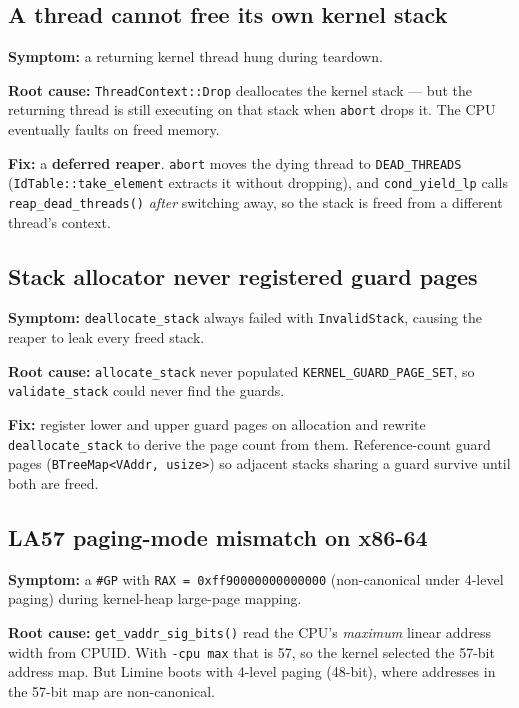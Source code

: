 \subsection{A thread cannot free its own kernel stack}

\textbf{Symptom:} a returning kernel thread hung during teardown.

\textbf{Root cause:} \texttt{ThreadContext::Drop} deallocates the kernel stack
--- but the returning thread is still executing on that stack when
\texttt{abort} drops it. The CPU eventually faults on freed memory.

\textbf{Fix:} a \textbf{deferred reaper}. \texttt{abort} moves the dying thread
to \texttt{DEAD\_THREADS} (\texttt{IdTable::take\_element} extracts it without
dropping), and \texttt{cond\_yield\_lp} calls \texttt{reap\_dead\_threads()}
\emph{after} switching away, so the stack is freed from a different thread's
context.

\subsection{Stack allocator never registered guard pages}

\textbf{Symptom:} \texttt{deallocate\_stack} always failed with
\texttt{InvalidStack}, causing the reaper to leak every freed stack.

\textbf{Root cause:} \texttt{allocate\_stack} never populated
\texttt{KERNEL\_GUARD\_PAGE\_SET}, so \texttt{validate\_stack} could never find
the guards.

\textbf{Fix:} register lower and upper guard pages on allocation and rewrite
\texttt{deallocate\_stack} to derive the page count from them. Reference-count
guard pages (\texttt{BTreeMap<VAddr, usize>}) so adjacent stacks sharing a
guard survive until both are freed.

\subsection{LA57 paging-mode mismatch on x86-64}

\textbf{Symptom:} a \texttt{\#GP} with \texttt{RAX = 0xff90000000000000}
(non-canonical under 4-level paging) during kernel-heap large-page mapping.

\textbf{Root cause:} \texttt{get\_vaddr\_sig\_bits()} read the CPU's
\emph{maximum} linear address width from CPUID. With \texttt{-cpu max} that is
57, so the kernel selected the 57-bit address map. But Limine boots with
4-level paging (48-bit), where addresses in the 57-bit map are non-canonical.

